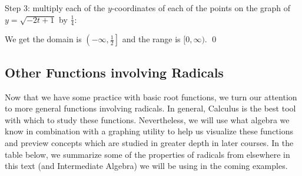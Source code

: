 \documentclass{ximera}
\begin{document}
\begin{example}
\begin{enumerate}



 
 
  Step 3:  multiply each of the $y$-coordinates of each of the points on the graph of $y = \sqrt{-2t+1}$ by $\frac{1}{4}$:
 
% 


\begin{center}
\end{center}

We get the domain is $\left(-\infty, \frac{1}{2} \right]$ and the range is $[0, \infty)$. \qed

\end{enumerate}


\end{example}

\subsection{Other Functions involving Radicals}
\label{OtherFunctionsinvolvingRadicals}

Now that we have some practice with basic root functions, we turn our attention to more general functions involving radicals.  In general, Calculus is the best tool with which to study these functions.  Nevertheless,  we will use what algebra we know in combination with a graphing utility to help us visualize these functions and preview concepts which are studied in greater depth in later courses. In the table below, we summarize some of the properties of radicals from elsewhere in this text (and Intermediate Algebra) we will be using in the coming examples.  
\end{document}
